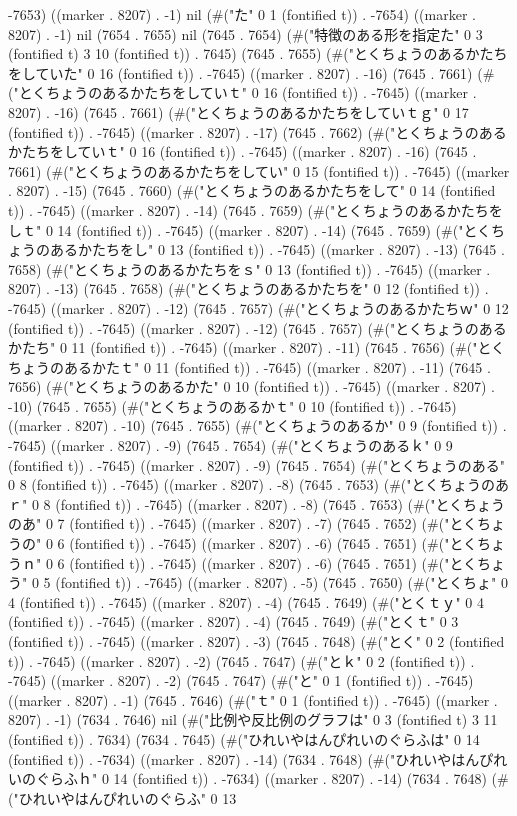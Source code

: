 -7653) ((marker . 8207) . -1) nil (#("た" 0 1 (fontified t)) . -7654) ((marker . 8207) . -1) nil (7654 . 7655) nil (7645 . 7654) (#("特徴のある形を指定た" 0 3 (fontified t) 3 10 (fontified t)) . 7645) (7645 . 7655) (#("とくちょうのあるかたちをしていた" 0 16 (fontified t)) . -7645) ((marker . 8207) . -16) (7645 . 7661) (#("とくちょうのあるかたちをしていｔ" 0 16 (fontified t)) . -7645) ((marker . 8207) . -16) (7645 . 7661) (#("とくちょうのあるかたちをしていｔｇ" 0 17 (fontified t)) . -7645) ((marker . 8207) . -17) (7645 . 7662) (#("とくちょうのあるかたちをしていｔ" 0 16 (fontified t)) . -7645) ((marker . 8207) . -16) (7645 . 7661) (#("とくちょうのあるかたちをしてい" 0 15 (fontified t)) . -7645) ((marker . 8207) . -15) (7645 . 7660) (#("とくちょうのあるかたちをして" 0 14 (fontified t)) . -7645) ((marker . 8207) . -14) (7645 . 7659) (#("とくちょうのあるかたちをしｔ" 0 14 (fontified t)) . -7645) ((marker . 8207) . -14) (7645 . 7659) (#("とくちょうのあるかたちをし" 0 13 (fontified t)) . -7645) ((marker . 8207) . -13) (7645 . 7658) (#("とくちょうのあるかたちをｓ" 0 13 (fontified t)) . -7645) ((marker . 8207) . -13) (7645 . 7658) (#("とくちょうのあるかたちを" 0 12 (fontified t)) . -7645) ((marker . 8207) . -12) (7645 . 7657) (#("とくちょうのあるかたちｗ" 0 12 (fontified t)) . -7645) ((marker . 8207) . -12) (7645 . 7657) (#("とくちょうのあるかたち" 0 11 (fontified t)) . -7645) ((marker . 8207) . -11) (7645 . 7656) (#("とくちょうのあるかたｔ" 0 11 (fontified t)) . -7645) ((marker . 8207) . -11) (7645 . 7656) (#("とくちょうのあるかた" 0 10 (fontified t)) . -7645) ((marker . 8207) . -10) (7645 . 7655) (#("とくちょうのあるかｔ" 0 10 (fontified t)) . -7645) ((marker . 8207) . -10) (7645 . 7655) (#("とくちょうのあるか" 0 9 (fontified t)) . -7645) ((marker . 8207) . -9) (7645 . 7654) (#("とくちょうのあるｋ" 0 9 (fontified t)) . -7645) ((marker . 8207) . -9) (7645 . 7654) (#("とくちょうのある" 0 8 (fontified t)) . -7645) ((marker . 8207) . -8) (7645 . 7653) (#("とくちょうのあｒ" 0 8 (fontified t)) . -7645) ((marker . 8207) . -8) (7645 . 7653) (#("とくちょうのあ" 0 7 (fontified t)) . -7645) ((marker . 8207) . -7) (7645 . 7652) (#("とくちょうの" 0 6 (fontified t)) . -7645) ((marker . 8207) . -6) (7645 . 7651) (#("とくちょうｎ" 0 6 (fontified t)) . -7645) ((marker . 8207) . -6) (7645 . 7651) (#("とくちょう" 0 5 (fontified t)) . -7645) ((marker . 8207) . -5) (7645 . 7650) (#("とくちょ" 0 4 (fontified t)) . -7645) ((marker . 8207) . -4) (7645 . 7649) (#("とくｔｙ" 0 4 (fontified t)) . -7645) ((marker . 8207) . -4) (7645 . 7649) (#("とくｔ" 0 3 (fontified t)) . -7645) ((marker . 8207) . -3) (7645 . 7648) (#("とく" 0 2 (fontified t)) . -7645) ((marker . 8207) . -2) (7645 . 7647) (#("とｋ" 0 2 (fontified t)) . -7645) ((marker . 8207) . -2) (7645 . 7647) (#("と" 0 1 (fontified t)) . -7645) ((marker . 8207) . -1) (7645 . 7646) (#("ｔ" 0 1 (fontified t)) . -7645) ((marker . 8207) . -1) (7634 . 7646) nil (#("比例や反比例のグラフは" 0 3 (fontified t) 3 11 (fontified t)) . 7634) (7634 . 7645) (#("ひれいやはんぴれいのぐらふは" 0 14 (fontified t)) . -7634) ((marker . 8207) . -14) (7634 . 7648) (#("ひれいやはんぴれいのぐらふｈ" 0 14 (fontified t)) . -7634) ((marker . 8207) . -14) (7634 . 7648) (#("ひれいやはんぴれいのぐらふ" 0 13 